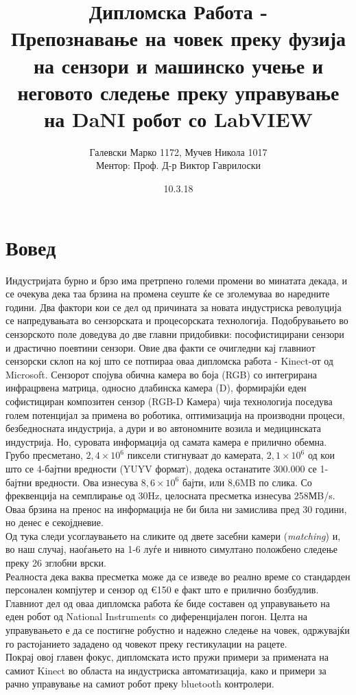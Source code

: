 \documentclass[12pt]{article}
\title{\bf Дипломска Работа - \\Препознавање на човек преку фузија на сензори и машинско учење и неговото следење
				преку управување на DaNI робот со LabVIEW}
\date{10.3.18}
\author{Галевски Марко 1172, Мучев Никола 1017	\\	Ментор: Проф. Д-р Виктор Гаврилоски}
\begin{document}
    \maketitle{}
    \newpage
    \tableofcontents
    \newpage
\section{Вовед}
  Индустријата бурно и брзо има претрпено големи промени во минатата декада, и се очекува дека таа брзина на промена сеуште ќе се зголемуваа во наредните години. Два фактори кои се дел од причината за новата индустриска револуција се напредувањата во сензорската и процесорската технологија.\bigbreak
  Подобрувањето во сензорското поле доведува до две главни придобивки: пософистицирани сензори и драстично поевтини сензори. Овие два факти се очигледни кај главниот сензорски склоп на кој што се потпираа оваа дипломска работа - Kinect-от од Microsoft. Сензорот спојува обична камера во боја (RGB) со интегрирана инфрацрвена матрица, односно длабинска камера (D), формирајќи еден софистициран композитен сензор (RGB-D Камера) чија технологија поседува голем потенцијал за примена во роботика, оптимизација на производни процеси, безбедносната индустрија, а дури и во автономните возила и медицинската индустрија.
  \bigbreak
  Но, суровата информација од самата камера е прилично обемна. Грубо пресметано, $2,4 \times 10^6$ пиксели стигнуваат до камерата, $2,1 \times 10^6$ од кои што се 4-бајтни вредности (YUYV формат), додека останатите 300.000 се 1-бајтни вредности. Ова изнесува $8,6 \times 10^6$ бајти, или 8,6MB по слика. Со фреквенција на семплирање од 30Hz, целосната пресметка изнесува 258МB/s. Оваа брзина на пренос на информација не би била ни замислива пред 30 години, но денес е секојдневие.
  \\
  Од тука следи усоглаувањето на сликите од двете засебни камери (\textit{matching}) и, во наш случај, наоѓањето на 1-6 луѓе и нивното симултано положбено следење преку 26 зглобни врски.
  \\
  Реалноста дека ваква пресметка може да се изведе во реално време со стандарден персонален компјутер и сензор од €150 е факт што е прилично бозбудлив.
  \bigbreak
  Главниот дел од оваа дипломска работа ќе биде составен од управувањето на еден робот од National Instruments со диференцијален погон. Целта на управувањето е да се постигне робустно и надежно следење на човек, одржувајќи го растојанието зададено од човекот преку гестикулации на рацете.
  \\
  Покрај овој главен фокус, дипломската исто пружи примери за примената на самиот Kinect во областа на индустриска автоматизација, како и примери за рачно управување на самиот робот преку bluetooth контролери.
\end{document}
